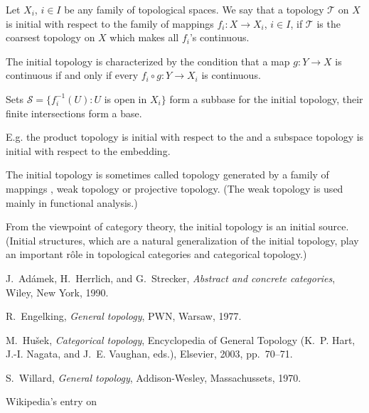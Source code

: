 \documentclass[12pt]{article}
\newcommand{\Map}[3]{#1\colon#2\to#3}
\begin{document}
Let $X_i$, $i\in I$ be any family of topological spaces.
We say that a topology $\mathcal T$ on $X$ is initial with respect to the family of mappings $\Map {f_i}X{X_i}$, $i\in I$, if $\mathcal T$ is the coarsest topology on $X$ which makes all $f_i$'s continuous.

The initial topology is characterized by the condition that a map $\Map gYX$ is continuous if and only if every $\Map {f_i \circ g}Y{X_i}$ is continuous.

Sets $\mathcal S=\{f_i^{-1}(U): U$ is open in $X_i\}$ form a subbase for the initial topology, their finite intersections form a base.

E.g. the product topology is initial with respect to the  and a subspace topology is initial with respect to the embedding.

The initial topology is sometimes called topology generated by a family of mappings \cite{engelking}, weak topology \cite{willard} or projective topology. (The  weak topology is used mainly in functional analysis.)

From the viewpoint of category theory, the initial topology is an initial source. (Initial structures, which are a natural generalization of the initial topology, play an important r\^{o}le in topological categories and categorical topology.)


\begin{thebibliography}{9}
J.~Ad\'amek, H.~Herrlich, and G.~Strecker, \emph{Abstract and concrete categories}, Wiley,
New York, 1990.

R.~Engelking, \emph{General topology}, PWN, Warsaw, 1977.

M.~Hu\v{s}ek, \emph{Categorical topology}, Encyclopedia of General Topology (K.~P. Hart,
J.-I. Nagata, and J.~E. Vaughan, eds.), Elsevier, 2003, pp.~70--71.

S.~Willard, \emph{General topology}, Addison-Wesley, Massachussets, 1970.

 Wikipedia's entry on 
\end{thebibliography}
\end{document}
